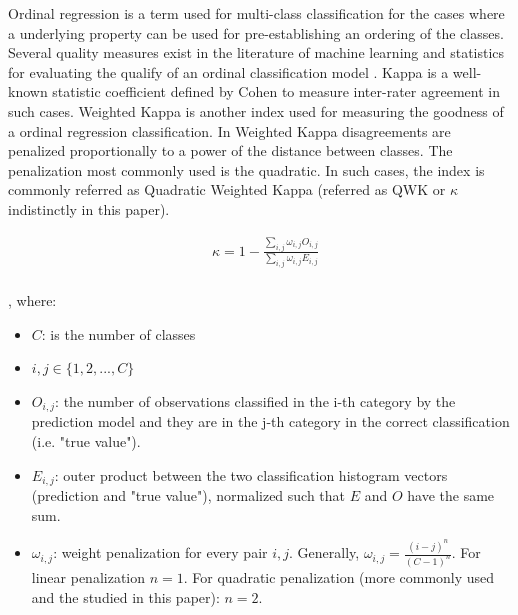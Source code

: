 \documentclass[review]{elsarticle}
\theoremstyle{definition} %
\theoremstyle{remark}
\begin{document}
Ordinal regression is a term used for multi-class classification for the cases where a underlying property can be used for pre-establishing an ordering of the classes. Several quality measures exist in the literature of machine learning and statistics for evaluating the qualify of an ordinal classification model \citep{mehdiyev2016evaluating}. Kappa is a well-known statistic coefficient defined by Cohen \citep{cohen1960coefficient} to measure inter-rater agreement in such cases. Weighted Kappa \citep{cohen1968weighted} is another index used for measuring the goodness of a ordinal regression classification. In Weighted Kappa disagreements are penalized proportionally to a power of the distance between classes. The penalization most commonly used is the quadratic. In such cases, the index is commonly referred as Quadratic Weighted Kappa (referred as QWK or $\kappa$ indistinctly in this paper). 


\begin{equation}
\label{eq:kappa}
\begin{aligned}
&\kappa = 1 - \frac{ \sum_{i,j} \omega_{i,j} O_{i,j} }
{\sum_{i,j} \omega_{i,j} E_{i,j}}\\
\end{aligned}
\end{equation}

, where:
\begin{itemize}
	\item[] $C$: is the number of classes
	\item[] $i, j \in \{ 1, 2, ..., C\}$
	\item[] $O_{i,j}$: the number of observations classified in the i-th category by the prediction model and they are in the j-th category in the correct classification (i.e. "true value").
	\item[] $E_{i,j}$: outer product between the two classification histogram vectors (prediction and "true value"), normalized such that $E$ and $O$ have the same sum.
	\item[] $\omega_{i,j}$: weight penalization for every pair $i,j$. Generally, $\omega_{i,j} = \frac{(i-j)^n}{(C - 1)^n}$. For linear penalization $n = 1$. For quadratic penalization (more commonly used and the studied in this paper): $n = 2$.
\end{itemize}
\end{document}
